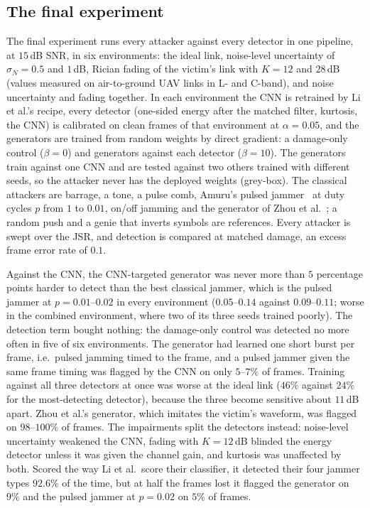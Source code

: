 \subsection{The final experiment}
The final experiment runs every attacker against every detector in one pipeline, at $15$\,dB SNR, in six environments: the ideal link, noise-level uncertainty of $\sigma_N=0.5$ and $1$\,dB, Rician fading of the victim's link with $K=12$ and $28$\,dB (values measured on air-to-ground UAV links in L- and C-band), and noise uncertainty and fading together.
In each environment the CNN is retrained by Li et al.'s recipe, every detector (one-sided energy after the matched filter, kurtosis, the CNN) is calibrated on clean frames of that environment at $\alpha=0.05$, and the generators are trained from random weights by direct gradient: a damage-only control ($\beta=0$) and generators against each detector ($\beta=10$).
The generators train against one CNN and are tested against two others trained with different seeds, so the attacker never has the deployed weights (grey-box).
The classical attackers are barrage, a tone, a pulse comb, Amuru's pulsed jammer~\cite{amuru2015optimal} at duty cycles $p$ from $1$ to $0.01$, on/off jamming and the generator of Zhou et al.~\cite{11184988}; a random push and a genie that inverts symbols are references.
Every attacker is swept over the JSR, and detection is compared at matched damage, an excess frame error rate of $0.1$.

Against the CNN, the CNN-targeted generator was never more than $5$ percentage points harder to detect than the best classical jammer, which is the pulsed jammer at $p=0.01$--$0.02$ in every environment ($0.05$--$0.14$ against $0.09$--$0.11$; worse in the combined environment, where two of its three seeds trained poorly).
The detection term bought nothing: the damage-only control was detected no more often in five of six environments.
The generator had learned one short burst per frame, i.e.\ pulsed jamming timed to the frame, and a pulsed jammer given the same frame timing was flagged by the CNN on only $5$--$7\%$ of frames.
Training against all three detectors at once was worse at the ideal link ($46\%$ against $24\%$ for the most-detecting detector), because the three become sensitive about $11$\,dB apart.
Zhou et al.'s generator, which imitates the victim's waveform, was flagged on $98$--$100\%$ of frames.
The impairments split the detectors instead: noise-level uncertainty weakened the CNN, fading with $K=12$\,dB blinded the energy detector unless it was given the channel gain, and kurtosis was unaffected by both.
Scored the way Li et al.\ score their classifier, it detected their four jammer types $92.6\%$ of the time, but at half the frames lost it flagged the generator on $9\%$ and the pulsed jammer at $p=0.02$ on $5\%$ of frames.

